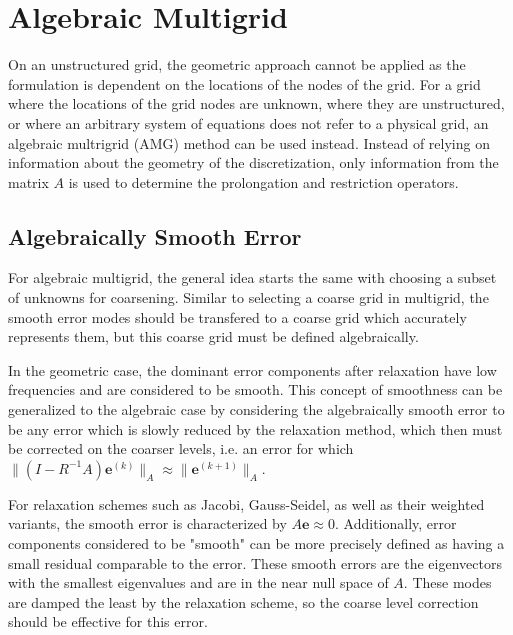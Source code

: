 

\section{Algebraic Multigrid}


On an unstructured grid, the geometric approach cannot be applied as the formulation is dependent on the locations of the nodes of the grid. For a grid where the locations of the grid nodes are unknown, where they are unstructured, or where an arbitrary system of equations does not refer to a physical grid, an algebraic multrigrid (AMG) method can be used instead. Instead of relying on information about the geometry of the discretization, only information from the matrix $A$ is used to determine the prolongation and restriction operators.


\subsection{Algebraically Smooth Error}

For algebraic multigrid, the general idea starts the same with choosing a subset of unknowns for coarsening. Similar to selecting a coarse grid in multigrid, the smooth error modes should be transfered to a coarse grid which accurately represents them, but this coarse grid must be defined algebraically. %

In the geometric case, the dominant error components after relaxation have low frequencies and are considered to be smooth. This concept of smoothness can be generalized to the algebraic case by considering the algebraically smooth error to be any error which is slowly reduced by the relaxation method, which then must be corrected on the coarser levels, i.e. an error for which $ \|(I - R^{-1}A)\mathbf{e}^{(k)}\|_A \approx \| \mathbf{e}^{(k+1)}\|_A $.

For relaxation schemes such as Jacobi, Gauss-Seidel, as well as their weighted variants, the smooth error is characterized by $ A\mathbf{e} \approx 0 $. Additionally, error components considered to be "smooth" can be more precisely defined as having a small residual comparable to the error. These smooth errors are the eigenvectors with the smallest eigenvalues and are in the near null space of $A$. These modes are damped the least by the relaxation scheme, so the coarse level correction should be effective for this error.

